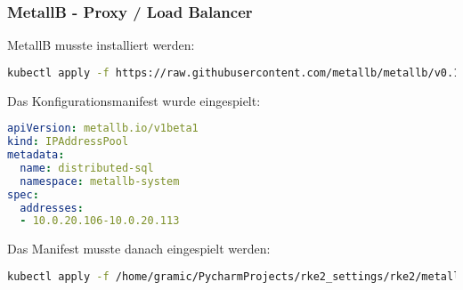\subsubsection{MetallB - Proxy / Load Balancer}
MetallB musste installiert werden:
\lstset{style=gra_codestyle}
\begin{lstlisting}[language=bash, caption=MetallB installieren,captionpos=b,label={lst:metallb-install},breaklines=true]
kubectl apply -f https://raw.githubusercontent.com/metallb/metallb/v0.14.4/config/manifests/metallb-native.yaml
\end{lstlisting}

Das Konfigurationsmanifest wurde eingespielt:
\lstset{style=gra_codestyle}
\begin{lstlisting}[language=yaml, caption=MetallB konfigurieren,captionpos=b,label={lst:metallb-config},breaklines=true]
apiVersion: metallb.io/v1beta1
kind: IPAddressPool
metadata:
  name: distributed-sql
  namespace: metallb-system
spec:
  addresses:
  - 10.0.20.106-10.0.20.113
\end{lstlisting}

Das Manifest musste danach eingespielt werden:
\lstset{style=gra_codestyle}
\begin{lstlisting}[language=bash, caption=MetallB Konfiguration einspielen,captionpos=b,label={lst:metallb-apply},breaklines=true]
kubectl apply -f /home/gramic/PycharmProjects/rke2_settings/rke2/metallb-values.yaml
\end{lstlisting}

